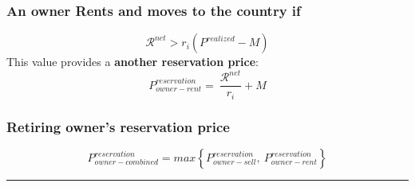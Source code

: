 \subsubsection{An owner Rents and moves to the country if} 
\[\mathcal{R}^{net}>r_i(P^{realized}-M)\]
This value provides a \textbf{another reservation price}: 
\[P_{owner-rent}^{reservation} =\ \frac{\mathcal{R}^{net}}{r_i}+M \]

\subsubsection{Retiring owner's reservation price}
\[P_{owner-combined}^{reservation}= max\left\{ P_{owner-sell}^{reservation} ,\ P_{owner-rent}^{reservation}\right\}\]

\hrule

